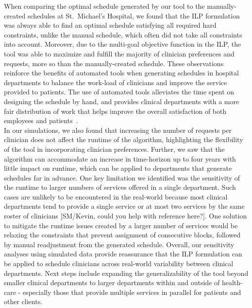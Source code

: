 When comparing the optimal schedule generated by our tool to the
manually-created schedules at St.\ Michael's Hospital, we found that the ILP
formulation was always able to find an optimal schedule satisfying all required
hard constraints, unlike the manual schedule, which often did not take all
constraints into account. Moreover, due to the multi-goal objective function in
the ILP, the tool was able to maximize and fulfill the majority of clinician
preferences and requests, more so than the manually-created schedule. These
observations reinforce the benefits of automated tools when generating schedules
in hospital departments to balance the work-load of clinicians and improve the
service provided to patients. The use of automated tools alleviates the time
spent on designing the schedule by hand, and provides clinical departments with
a more fair distribution of work that helps improve the overall satisfaction of
both employees and patients~\cite{silvestro_evaluation_2000}. \\  %

In our simulations, we also found that increasing the number of requests per
clinician does not affect the runtime of the algorithm, highlighting the
flexibility of the tool in incorporating clinician preferences. Further, we saw
that the algorithm can accommodate an increase in time-horizon up to four years
with little impact on runtime, which can be applied to departments that generate
schedules far in advance. One key limitation we identified was the sensitivity
of the runtime to larger numbers of services offered in a single department.
Such cases are unlikely to be encountered in the real-world because most
clinical departments tend to provide a single service or at most two services by
the same roster of clinicians [{\color{red}SM/Kevin, could you help with
	reference here?}]. One solution to mitigate the runtime issues created by a
larger number of services would be relaxing the constraints that prevent
assignment of consecutive blocks, followed by manual readjustment from the
generated schedule. %
Overall, our sensitivity analyses using simulated data provide reassurance that
the ILP formulation can be applied to schedule clinicians across real-world
variability between clinical departments. %
Next steps include expanding the generalizability of the tool beyond smaller
clinical departments to larger departments within and outside of health-care -
especially those that provide multiple services in parallel for patients and
other clients. 
